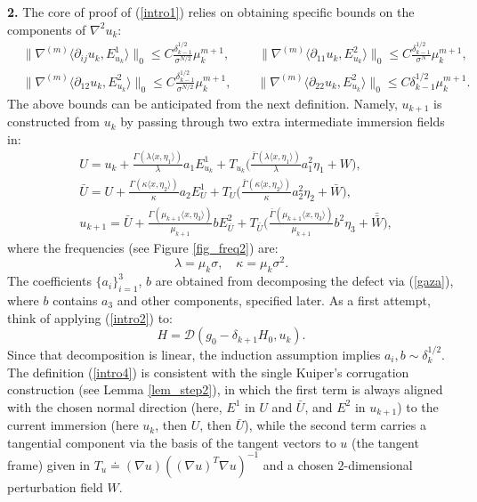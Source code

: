 \documentclass[reqno,twoside,11pt]{amsart}
\newcommand*{\dbar}[1]{\bar{\bar{#1}}}
\numberwithin{equation}{section}
\theoremstyle{plain}
\theoremstyle{definition}
\begin{document}
\medskip

{\bf 2.} The core of proof of (\ref{intro1})  relies on obtaining specific bounds on the
components of $\nabla^2u_k$: 
\begin{equation}\label{intro3}
\begin{split}
& \|\nabla^{(m)} \langle \partial_{ij}u_k,E^1_{u_k}\rangle\|_0\leq
C\frac{\delta_{k-1}^{1/2}}{\sigma^{N/2}}\mu_{k}^{m+1}, \; \qquad 
\|\nabla^{(m)} \langle \partial_{11}u_k,E^2_{u_k}\rangle\|_0\leq
C\frac{\delta_{k-1}^{1/2}}{\sigma^{N}}\mu_{k}^{m+1},\\
& \|\nabla^{(m)} \langle \partial_{12}u_k,E^2_{u_k}\rangle\|_0\leq
C \frac{\delta_{k-1}^{1/2}}{\sigma^{N/2}}\mu_{k}^{m+1},\qquad
\|\nabla^{(m)} \langle \partial_{22}u_k,E^2_{u_k}\rangle\|_0\leq
C \delta_{k-1}^{1/2}\mu_{k}^{m+1}.
\end{split}
\end{equation}
The above bounds can be anticipated from the next definition. Namely, $u_{k+1}$ is
constructed from $u_k$ by passing through two extra intermediate immersion fields in:
\begin{equation}\label{intro4}
\begin{split}
& {U} = u_k + \frac{\Gamma(\lambda \langle x, \eta_1\rangle)}{\lambda} a_1 {E^1_{u_k}}
+ T_{u_k}\Big(\frac{\bar\Gamma(\lambda \langle x, \eta_1\rangle)}{\lambda}a_1^2\eta_1 + W\Big),\\
& {\bar U} = U + \frac{\Gamma(\kappa \langle x, \eta_2\rangle)}{\kappa} a_2{E^1_{U}}
+ T_{U}\Big(\frac{\bar\Gamma(\kappa \langle x,
  \eta_2\rangle)}{\kappa}a_2^2\eta_2 + \bar W\Big), \\
& {u_{k+1}} = \bar U + \frac{\Gamma(\mu_{k+1} \langle x,
  \eta_3\rangle)}{\mu_{k+1}} b {E^2_{\bar U}} + T_{\bar
  U}\Big(\frac{\bar\Gamma(\mu_{k+1} \langle x, \eta_3\rangle)}{\mu_{k+1}}b^2\eta_3 + \dbar W\Big),
\end{split}
\end{equation}
where the frequencies (see Figure \ref{fig_freq2}) are: 
$$\lambda = \mu_k\sigma, \quad \kappa=\mu_k\sigma^2.$$
The coefficients $\{a_i\}_{i=1}^3$, $b$ are obtained from decomposing the
defect via (\ref{gaza}), where $b$ contains $a_3$ and other components,
specified later. As a first attempt, think of applying (\ref{intro2}) to:
$$H=\mathcal{D}(g_0-\delta_{k+1}H_0, u_{k}).$$ 
Since that decomposition is linear, the induction
assumption implies $a_i, b\sim \delta_k^{1/2}$.
The definition (\ref{intro4}) is consistent with the
single Kuiper's corrugation construction (see Lemma \ref{lem_step2}),
in which the first term is always aligned with the chosen normal direction
(here, $E^1$ in $U$ and $\bar U$, and $E^2$ in $u_{k+1}$) to the current
immersion (here $u_k$, then $U$, then $\bar U$), 
while the second term carries a tangential component via
the basis of the tangent vectors to $u$ (the tangent frame) given in 
$T_u\doteq (\nabla u) ((\nabla u)^T\nabla u)^{-1}$ and a chosen
$2$-dimensional perturbation field $W$.
\end{document}
